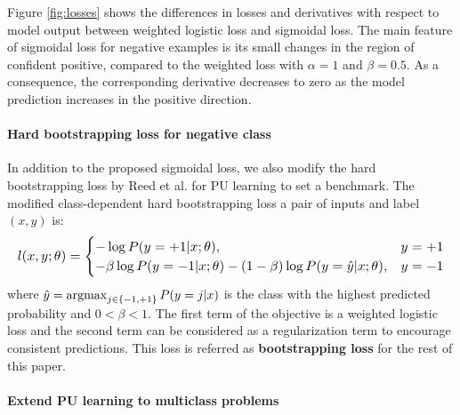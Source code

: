 Figure \ref{fig:losses} shows the differences in losses and derivatives with respect to model output between weighted logistic loss and sigmoidal loss.
The main feature of sigmoidal loss for negative examples is its small changes in the region of confident positive, compared to the weighted loss with $\alpha=1$ and $\beta=0.5$.
As a consequence, the corresponding derivative decreases to zero as the model prediction increases in the positive direction.


\paragraph{Hard bootstrapping loss for negative class}
In addition to the proposed sigmoidal loss, we also modify the hard bootstrapping loss by Reed et al. \cite{reed2014training} for PU learning to set a benchmark.
The modified class-dependent hard bootstrapping loss a pair of inputs and label $(x,y)$ is:
\begin{equation*}
\resizebox{\columnwidth}{!}{$
  l(x, y; \theta) =
    \begin{cases}
      - \log P(y=+1 \vert x; \theta), & y = +1 \\
      - \beta \log P(y=-1 \vert x;\theta) - (1-\beta) \log P(y=\hat{y} \vert x;\theta), & y = -1
    \end{cases}
$}
\end{equation*}
where $\hat{y} = \operatorname*{argmax}_{j\in\{-1,+1\}}{P(y=j \vert x)}$ is the class with the highest predicted probability and $0<\beta<1$.
The first term of the objective is a weighted logistic loss and the second term can be considered as a regularization term to encourage consistent predictions.
This loss is referred as \textbf{bootstrapping loss} for the rest of this paper.

\paragraph{Extend PU learning to multiclass problems}


